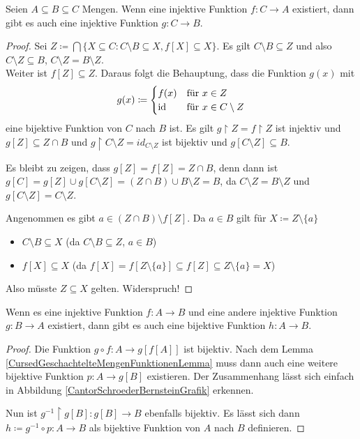 \begin{lemma}
	Seien $A\subseteq B \subseteq C$ Mengen. Wenn eine injektive Funktion $f:C\to A$ existiert, dann gibt es auch eine injektive Funktion $g:C\to B$.
	\label{CursedGeschachtelteMengenFunktionenLemma}
\end{lemma}
\begin{proof}
	Sei $Z\coloneqq \bigcap \{X\subseteq C : C\setminus B\subseteq X, f[X]\subseteq X\}$. Es gilt $C\setminus B\subseteq Z$ und also $C\setminus Z\subseteq B$, $C\setminus Z = B\setminus Z$.
	\\
	Weiter ist $f[Z]\subseteq Z$. Daraus folgt die Behauptung, dass die Funktion $g(x)$ mit $$g(x)\coloneqq\begin{cases} f(x) & \text{für } x \in Z \\ \operatorname{id} & \text{für } x \in C \setminus Z \end{cases}$$
	eine bijektive Funktion von $C$ nach $B$ ist. Es gilt $g \upharpoonright Z=f\upharpoonright Z$ ist injektiv und $g[Z]\subseteq Z \cap B$ und $g \upharpoonright C \setminus Z = id_{C\setminus Z}$ ist bijektiv und $g[C\setminus Z] \subseteq B$.
	
	Es bleibt zu zeigen, dass $g[Z]=f[Z]=Z\cap B$, denn dann ist $g[C]=g[Z]\cup g[C\setminus Z]=(Z\cap B)\cup B\setminus Z=B$, da $C\setminus Z = B \setminus Z$ und $g[C\setminus Z]=C\setminus Z$.
	
	Angenommen es gibt $a\in (Z\cap B)\setminus f[Z]$. Da $a\in B$ gilt für $X\coloneqq Z \setminus \{a\}$
	\begin{itemize}
		\item $C\setminus B\subseteq X$ (da $C\setminus B \subseteq Z$, $a\in B$)
		\item $f[X]\subseteq X$ (da $f[X]=f[Z\setminus \{a\}]\subseteq f[Z] \subseteq Z\setminus \{a\}=X$)
	\end{itemize}
	Also müsste $Z \subseteq X$ gelten. Widerspruch!
\end{proof}

\begin{satz}
	Wenn es eine injektive Funktion $f:A\to B$ und eine andere injektive Funktion $g : B\to A$ existiert, dann gibt es auch eine bijektive Funktion $h:A\to B$.
	\label{SatzCantorSchroederBernstein}
\end{satz}
\begin{proof}
	Die Funktion $g\circ f : A \to g[f[A]]$ ist bijektiv. Nach dem Lemma \ref{CursedGeschachtelteMengenFunktionenLemma} muss dann auch eine weitere bijektive Funktion $p: A \to g[B]$ existieren. Der Zusammenhang lässt sich einfach in Abbildung \ref{CantorSchroederBernsteinGrafik} erkennen. 
	
	Nun ist $g^{-1}\upharpoonright g[B] : g[B]\to B$ ebenfalls bijektiv. Es lässt sich dann $h\coloneqq g^{-1}\circ p : A\to B$ als bijektive Funktion von $A$ nach $B$ definieren. 
\end{proof}

